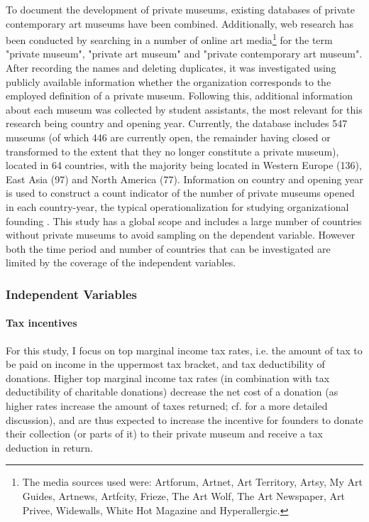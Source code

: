 \documentclass[11pt]{article}
\begin{document}
To document the development of private museums, existing databases of private contemporary art museums \parencite{LarrysList_2015_report,Independent_collectors,global_private_museum_network_2020_museums,BMW_Independent_Collectors_2018_artguide,vdEerenbeemt_vdWauw_DDD_2016} have been combined.
Additionally, web research has been conducted by searching in a number of online art media\footnote{The media sources used were: Artforum, Artnet, Art Territory, Artsy, My Art Guides, Artnews, Artfcity, Frieze, The Art Wolf, The Art Newspaper, Art Privee, Widewalls, White Hot Magazine and Hyperallergic.} for the term "private museum", "private art museum" and "private contemporary art museum".
After recording the names and deleting duplicates, it was investigated using publicly available information whether the organization corresponds to the employed definition of a private museum.
Following this, additional information about each museum was collected by student assistants, the most relevant for this research being country and opening year.
Currently, the database includes 547 museums (of which 446 are currently open, the remainder having closed or transformed to the extent that they no longer constitute a private museum), located in 64 countries, with the majority being located in Western Europe (136), East Asia (97) and North America (77).
Information on country and opening year is used to construct a count indicator of the number of private museums opened in each country-year, the typical operationalization for studying organizational founding \parencite{Bogaert_etal_2014_ecological}. 
This study has a global scope and  includes a large number of countries without private museums to avoid sampling on the dependent variable. 
However both the time period and number of countries that can be investigated are limited by the coverage of the independent variables. 


\subsubsection*{Independent Variables}

\paragraph*{Tax incentives}

For this study, I focus on top marginal income tax rates, i.e. the amount of tax to be paid on income in the uppermost tax bracket, and tax deductibility of donations.
Higher top marginal income tax rates (in combination with tax deductibility of charitable donations) decrease the net cost of a donation (as higher rates increase the amount of taxes returned; cf. \cite{Hemels_2017_incentives} for a more detailed discussion), and are thus expected to increase the incentive for founders to donate their collection (or parts of it) to their private museum and receive a tax deduction in return. 
\end{document}
